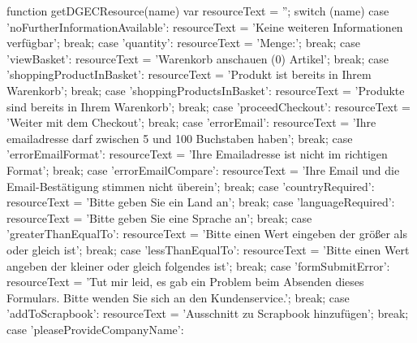             function getDGECResource(name) {
                var resourceText = '';
                switch (name) {
                    case 'noFurtherInformationAvailable':
                        resourceText = 'Keine weiteren Informationen verfügbar';
                        break;
                    case 'quantity':
                        resourceText = 'Menge:';
                        break;
                    case 'viewBasket':
                        resourceText = 'Warenkorb anschauen (0) Artikel';
                        break;
                    case 'shoppingProductInBasket':
                        resourceText = 'Produkt ist bereits in Ihrem Warenkorb';
                        break;
                    case 'shoppingProductsInBasket':
                        resourceText = 'Produkte sind bereits in Ihrem Warenkorb';
                        break;
                    case 'proceedCheckout':
                        resourceText = 'Weiter mit dem Checkout';
                        break;
                    case 'errorEmail':
                        resourceText = 'Ihre emailadresse darf zwischen 5 und 100 Buchstaben haben';
                        break;
                    case 'errorEmailFormat':
                        resourceText = 'Ihre Emailadresse ist nicht im richtigen Format';
                        break;
                    case 'errorEmailCompare':
                        resourceText = 'Ihre Email und die Email-Bestätigung stimmen nicht überein';
                        break;
                    case 'countryRequired':
                        resourceText = 'Bitte geben Sie ein Land an';
                        break;
                    case 'languageRequired':
                        resourceText = 'Bitte geben Sie eine Sprache an';
                        break;
                    case 'greaterThanEqualTo':
                        resourceText = 'Bitte einen Wert eingeben der größer als oder gleich ist';
                        break;
                    case 'lessThanEqualTo':
                        resourceText = 'Bitte einen Wert angeben der kleiner oder gleich folgendes ist';
                        break;
                    case 'formSubmitError':
                        resourceText = 'Tut mir leid, es gab ein Problem beim Absenden dieses Formulars. Bitte wenden Sie sich an den Kundenservice.';
                        break;
                    case 'addToScrapbook':
                        resourceText = 'Ausschnitt zu Scrapbook hinzufügen';
                        break;
                    case 'pleaseProvideCompanyName':
}}
